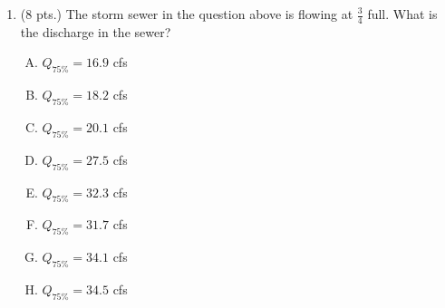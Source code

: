 \documentclass[11pt]{article}
\begin{document}
\begin{enumerate}
\begin{enumerate} [(A)]
\item  $17.8$ cfs
\item  $19.2$ cfs
\item  $22.1$ cfs
\item  $28.9$ cfs
\item  $31.2$ cfs
\item  $33.4$ cfs
\item  $35.9$ cfs
\item  $36.4$ cfs
\end{enumerate}


\clearpage
\item (8 pts.)
The storm sewer in the question above is flowing at $\frac{3}{4}$ full.  What is the discharge in the sewer?
\begin{enumerate} [(A)]
\item  $Q_{75\%}= 16.9$ cfs
\item  $Q_{75\%}= 18.2$ cfs
\item  $Q_{75\%}= 20.1$ cfs
\item  $Q_{75\%}= 27.5$ cfs
\item  $Q_{75\%}= 32.3$ cfs
\item  $Q_{75\%}= 31.7$ cfs
\item  $Q_{75\%}= 34.1$ cfs
\item  $Q_{75\%}= 34.5$ cfs
\end{enumerate}



\end{enumerate}
\end{document}
